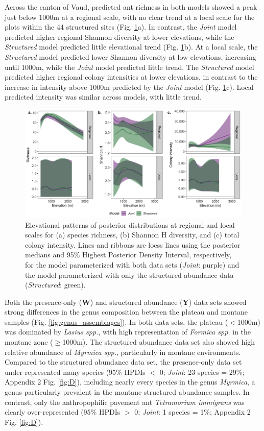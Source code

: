 \documentclass[preprint,review,times,12pt,3p]{elsarticle}
\begin{document}
Across the canton of Vaud, predicted ant richness in both models showed a peak just below 1000m at a regional scale, with no clear trend at a local scale for the plots within the 44 structured sites (Fig. \ref{fig:el_patterns}a). In contrast, the \emph{Joint} model predicted higher regional Shannon diversity at lower elevations, while the \emph{Structured} model predicted little elevational trend (Fig. \ref{fig:el_patterns}b). At a local scale, the \emph{Structured} model predicted lower Shannon diversity at low elevations, increasing until 1000m, while the \emph{Joint} model predicted little trend. The \emph{Structured} model predicted higher regional colony intensities at lower elevations, in contrast to the increase in intensity above 1000m predicted by the \emph{Joint} model (Fig. \ref{fig:el_patterns}c). Local predicted intensity was similar across models, with little trend. 

\begin{figure}
	\centering\includegraphics[width=6in]{../../../ms/1_Ecography/1/figs/el_patterns.png}
	\caption{\label{fig:el_patterns} Elevational patterns of posterior distributions at regional and local scales for (a) species richness, (b) Shannon H diversity, and (c) total colony intensity. Lines and ribbons are loess lines using the posterior medians and 95\% Highest Posterior Density Interval, respectively, for the model parameterized with both data sets (\emph{Joint}: purple) and the model parameterized with only the structured abundance data (\emph{Structured}: green). }
\end{figure}

Both the presence-only (\textbf{W}) and structured abundance (\textbf{Y}) data sets showed strong differences in the genus composition between the plateau and montane samples (Fig. \ref{fig:genus_assemblages}). In both data sets, the plateau ($<$1000m) was dominated by \emph{Lasius spp.}, with high representation of \emph{Formica spp.} in the montane zone ($\geq$1000m). The structured abundance data set also showed high relative abundance of \emph{Myrmica spp.}, particularly in montane environments. Compared to the structured abundance data set, the presence-only data set under-represented many species (95\% HPDIs $<$ 0; \emph{Joint}: 23 species = 29\%; Appendix 2 Fig. \ref{fig:D}), including nearly every species in the genus \emph{Myrmica}, a genus particularly prevalent in the montane structured abundance samples. In contrast, only the anthropophilic pavement ant \emph{Tetramorium immigrans} was clearly over-represented (95\% HPDIs $>$ 0; \emph{Joint}: 1 species = 1\%; Appendix 2 Fig. \ref{fig:D}). 
\end{document}
